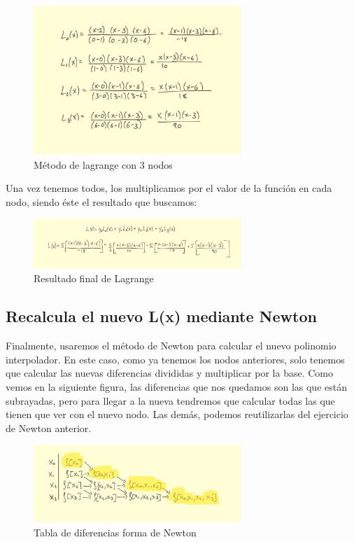 \documentclass{article}
\begin{document}
\begin{figure}[h]
  \center
  \includegraphics[width=0.7\textwidth]{src/lagrange2_1.jpg}
  \caption{Método de lagrange con 3 nodos}
\end{figure}

Una vez tenemos todos, los multiplicamos por el valor de la función en cada nodo, siendo éste el resultado que buscamos:

\begin{figure}[h]
  \center
  \includegraphics[width=0.7\textwidth]{src/lagrange2terminado.jpg}
  \caption{Resultado final de Lagrange}
\end{figure}

\subsection{Recalcula el nuevo L(x) mediante Newton}

Finalmente, usaremos el método de Newton para calcular el nuevo polinomio interpolador. En este caso, como ya tenemos los nodos anteriores, solo tenemos que calcular las nuevas diferencias divididas y multiplicar por la base. Como vemos en la siguiente figura, las diferencias que nos quedamos son las que están subrayadas, pero para llegar a la nueva tendremos que calcular todas las que tienen que ver con el nuevo nodo. Las demás, podemos reutilizarlas del ejercicio de Newton anterior.

\begin{figure}[h]
  \center
  \includegraphics[width=0.7\textwidth]{src/newtontabla.jpg}
  \caption{Tabla de diferencias forma de Newton}
\end{figure}
\end{document}
